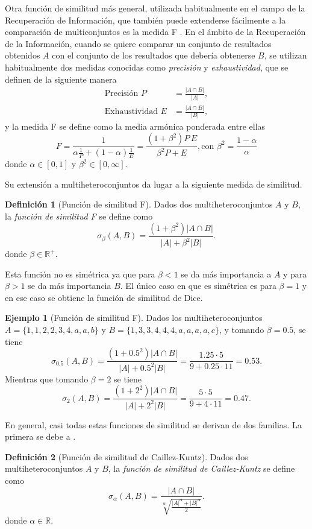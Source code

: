 \documentclass[a4paper,10pt,twoside]{article}
\theoremstyle{definition}
\newtheorem{definition}{Definición}
\newtheorem{example}{Ejemplo}
\begin{document}
Otra función de similitud más general, utilizada habitualmente en el campo de la Recuperación de Información, que también puede extenderse fácilmente a la comparación de multiconjuntos es la medida F \cite{rijsbergen1979information}.
En el ámbito de la Recuperación de la Información, cuando se quiere comparar un conjunto de resultados obtenidos $A$ con
el conjunto de los resultados que debería obtenerse $B$, se utilizan habitualmente dos medidas conocidas como
\emph{precisión} y \emph{exhaustividad}, que se definen de la siguiente manera
\begin{align*}
\mbox{Precisión } P &= \frac{|A\cap B|}{|A|},\\
\mbox{Exhaustividad } E&= \frac{|A\cap B|}{|B|},
\end{align*}
y la medida F se define como la media armónica ponderada entre ellas
\[
F = \frac{1}{\alpha\frac{1}{P}+(1-\alpha)\frac{1}{E}}=\frac{(1+\beta^2)P\,E}{\beta^2 P+E}, \mbox{con }
\beta^2=\frac{1-\alpha}{\alpha}
\]
donde $\alpha\in[0,1]$ y $\beta^2\in [0,\infty]$.

Su extensión a multiheteroconjuntos da lugar a la siguiente medida de similitud. 

\begin{definition}[Función de similitud F]
Dados dos multiheteroconjuntos $A$ y $B$, la \emph{función de similitud F} se define como
\[
\sigma_\beta(A,B) = \frac{(1+\beta^2)|A\cap B|}{|A|+\beta^2|B|}.
\]
donde $\beta\in \mathbb{R}^+.$
\end{definition}

Esta función no es simétrica ya que para $\beta<1$ se da más importancia a $A$ y para $\beta>1$ se da más importancia $B$. 
El único caso en que es simétrica es para $\beta=1$ y en ese caso se obtiene la función de similitud de Dice.

\begin{example}[Función de similitud F]
Dados los multiheteroconjuntos $A=\{1,1,2,2,3,4,a,a,b\}$ y $B=\{1,3,3,4,4,4,a,a,a,a,c\}$, y tomando $\beta=0.5$, se tiene
\[
\sigma_{0.5}(A,B) = \frac{(1+0.5^2)|A\cap B|}{|A|+0.5^2|B|} = \frac{1.25\cdot 5}{9+0.25\cdot 11} = 0.53.
\]
Mientras que tomando $\beta=2$ se tiene
\[
\sigma_{2}(A,B) = \frac{(1+2^2)|A\cap B|}{|A|+2^2|B|} = \frac{5\cdot 5}{9+4\cdot 11} = 0.47.
\]
\end{example}

En general, casi todas estas funciones de similitud se derivan de dos familias. 
La primera se debe a \cite{caillez1996contribution}.

\begin{definition}[Función de similitud de Caillez-Kuntz]
Dados dos multiheteroconjuntos $A$ y $B$, la \emph{función de similitud de Caillez-Kuntz} se define como
\[
\sigma_\alpha(A,B) = \frac{|A\cap B|}{\sqrt[\alpha]{\frac{|A|^\alpha+|B|^\alpha}{2}}}.
\]
donde $\alpha\in \mathbb{R}$.
\end{definition}
\end{document}
